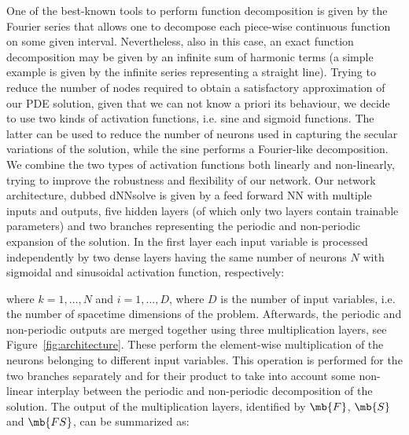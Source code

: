 \documentclass{article}
\begin{document}
One of the best-known tools to perform function decomposition is given by the Fourier series that allows one to decompose each piece-wise continuous function on some given interval. Nevertheless, also in this case, an exact function decomposition may be given by an infinite sum of  harmonic terms (a simple example is given by the infinite series representing a straight line). Trying to reduce the number of nodes required to obtain a satisfactory approximation of our PDE solution, given that we can not know a priori its behaviour, we decide to use two kinds of activation functions, i.e. sine and sigmoid functions. The latter can be used to reduce the number of neurons used in capturing the secular variations of the solution, while the sine performs a Fourier-like decomposition. We combine the two types of activation functions both linearly and non-linearly, trying to improve the robustness and flexibility of our network.
Our network architecture, dubbed \textsf{dNNsolve} is given by a feed forward NN with multiple inputs and outputs, five hidden layers (of which only two layers contain trainable parameters) and two branches representing the periodic and non-periodic expansion of the solution. In the first layer each input variable is processed independently by two dense layers having the same number of neurons $N$ with sigmoidal and sinusoidal activation function, respectively:
\begin{center}
\end{center}
where $k=1, \dots, N$ and $i = 1, \dots, D$, where $D$ is the number of input variables, i.e. the number of spacetime dimensions of the problem.
Afterwards, the periodic and non-periodic outputs are merged together using three multiplication layers, see Figure~\ref{fig:architecture}. These perform the element-wise multiplication of the neurons belonging to different input variables. This operation is performed for the two branches separately and for their product to take into account some non-linear interplay between the periodic and non-periodic decomposition of the solution.
The output of the multiplication layers, identified by $\mb{F}$, $\mb{S}$ and $\mb{FS}$, can be summarized as:
\beq
\label{eq:HiddenLayers}
\end{document}
